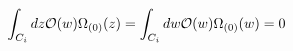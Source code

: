 \begin{equation}
\int_{C_i} dz  {\cal O}(w)\Omega_{(0)}(z) = \int_{C_i} dw  {\cal
  O}(w)\Omega_{(0)}(w)=0
\end{equation}

